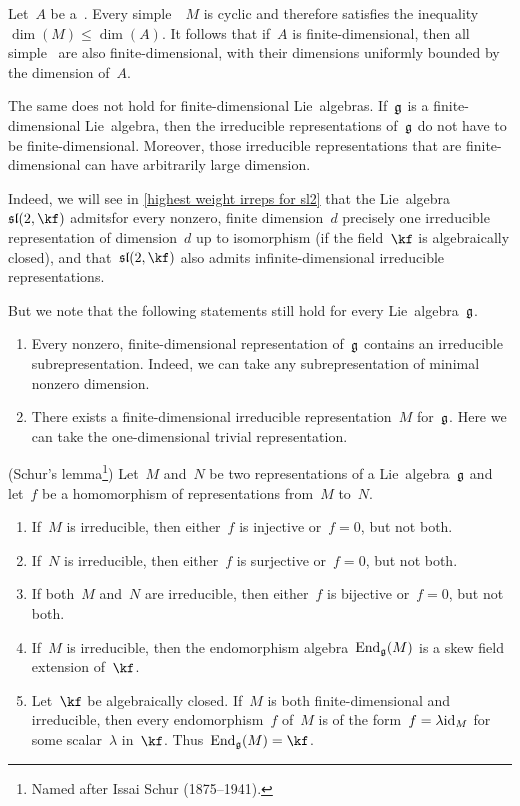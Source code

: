 \begin{remark}
	Let~$A$ be a~{\algebra{$\kf$}}.
	Every simple~{}~$M$ is cyclic and therefore satisfies the inequality~$\dim(M) \leq \dim(A)$.
	It follows that if~$A$ is finite-dimensional, then all simple~{} are also finite-dimensional, with their dimensions uniformly bounded by the dimension of~$A$.
	
	The same does not hold for finite-dimensional Lie~algebras.
	If~$\mathfrak{g}$ is a finite-dimensional Lie~algebra, then the irreducible representations of~$\mathfrak{g}$ do not have to be finite-dimensional.
	Moreover, those irreducible representations that are finite-dimensional can have arbitrarily large dimension.
	
	Indeed, we will see in \cref{highest weight irreps for sl2} that the Lie~algebra~$\sllie(2,\kf)$ admitsfor every nonzero, finite dimension~$d$ precisely one irreducible representation of dimension~$d$ up to isomorphism (if the field~$\kf$ is algebraically closed), and that~$\sllie(2,\kf)$ also admits infinite-dimensional irreducible representations.
	
	But we note that the following statements still hold for every Lie~algebra~$\mathfrak{g}$.
	\begin{enumerate}
		\item
			Every nonzero, finite-dimensional representation of~$\mathfrak{g}$ contains an irreducible subrepresentation.
			Indeed, we can take any subrepresentation of minimal nonzero dimension.
		\item
			There exists a finite-dimensional irreducible representation~$M$ for~$\mathfrak{g}$.
			Here we can take the one-dimensional trivial representation.
	\end{enumerate}
\end{remark}


\begin{proposition}(Schur’s lemma\footnote{Named after Issai Schur (1875--1941).})
	\label{schurs lemma}
	Let~$M$ and~$N$ be two representations of a Lie~algebra~$\mathfrak{g}$ and let~$f$ be a homomorphism of representations from~$M$ to~$N$.
	\begin{enumerate}
		\item
			If~$M$ is irreducible, then either~$f$ is injective or~$f = 0$, but not both.
		\item
			If~$N$ is irreducible, then either~$f$ is surjective or~$f = 0$, but not both.
		\item
			If both~$M$ and~$N$ are irreducible, then either~$f$ is bijective or~$f = 0$, but not both.
		\item
			If~$M$ is irreducible, then the endomorphism algebra~$\operatorname{End}_{\mathfrak{g}}(M)$ is a skew field extension of~$\kf$.
		\item
			\label{endomorphism algebra consists of scalars}
			Let~$\kf$ be algebraically closed.
			If~$M$ is both finite-dimensional and irreducible, then every endomorphism~$f$ of~$M$ is of the form~$f = \lambda \mathrm{id}_M$ for some scalar~$\lambda$ in~$\kf$.
			Thus~$\End_{\glie}(M) = \kf$.
	\end{enumerate}
\end{proposition}


